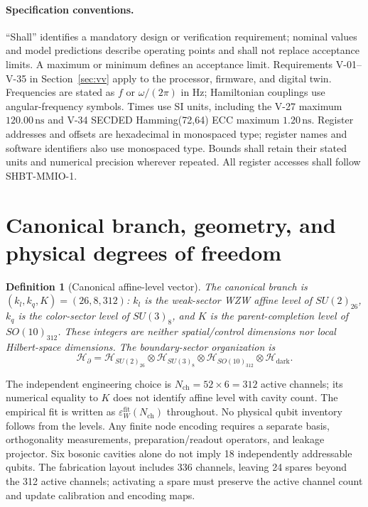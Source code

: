 \documentclass[11pt,a4paper]{article}
\newtheorem{definition}[theorem]{Definition}
\newcommand{\Hil}{\mathcal H}
\newcommand{\unit}[1]{\,\mathrm{#1}}
\begin{document}
\paragraph{Specification conventions.}
``Shall'' identifies a mandatory design or verification requirement; nominal values
and model predictions describe operating points and shall not replace acceptance
limits. A maximum or minimum defines an acceptance limit. Requirements V-01--V-35 in
Section~\ref{sec:vv} apply to the processor, firmware, and digital twin. Frequencies
are stated as $f$ or $\omega/(2\pi)$ in Hz; Hamiltonian couplings use angular-frequency
symbols. Times use SI units, including the V-27 maximum $120.00\unit{ns}$ and V-34
SECDED Hamming(72,64) ECC maximum $1.20\unit{ns}$. Register addresses and offsets are
hexadecimal in monospaced type; register names and software identifiers also use
monospaced type. Bounds shall retain their stated units and numerical precision
wherever repeated. All register accesses shall follow SHBT-MMIO-1.

\section{Canonical branch, geometry, and physical degrees of freedom}
\label{sec:geometry}
\begin{definition}[Canonical affine-level vector]
The canonical branch is $(k_l,k_q,K)=(26,8,312)$: $k_l$ is the weak-sector WZW
affine level of $SU(2)_{26}$, $k_q$ is the color-sector level of $SU(3)_8$, and $K$ is
the parent-completion level of $SO(10)_{312}$.
These integers are neither spatial/control dimensions nor local Hilbert-space dimensions.
The boundary-sector organization is
\[
 \Hil_\partial=\Hil_{SU(2)_{26}}\otimes\Hil_{SU(3)_8}
 \otimes\Hil_{SO(10)_{312}}\otimes\Hil_{\mathrm{dark}}.
\]
\end{definition}
The independent engineering choice is $N_{\mathrm{ch}}=52\times6=312$ active channels;
its numerical equality to $K$ does not identify affine level with cavity count. The empirical
fit is written as $\varepsilon_W^{\mathrm{fit}}(N_{\mathrm{ch}})$ throughout.
No physical qubit inventory follows from the levels. Any finite node encoding requires a
separate basis, orthogonality measurements, preparation/readout operators, and leakage projector.
Six bosonic cavities alone do not imply 18 independently addressable qubits.
The fabrication layout includes 336 channels,
leaving 24 spares beyond the 312 active channels; activating a spare must preserve the active
channel count and update calibration and encoding maps.
\end{document}
